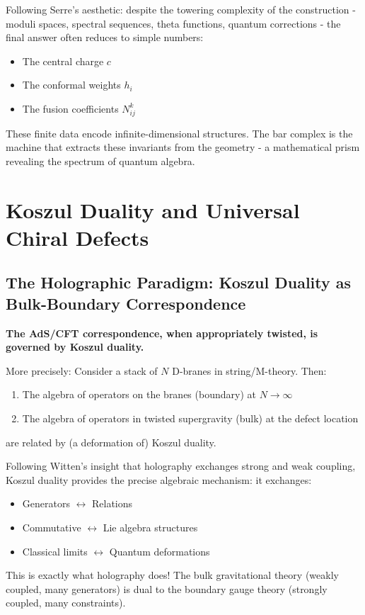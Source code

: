 \begin{remark}
Following Serre's aesthetic: despite the towering complexity of the construction - moduli spaces, spectral sequences, theta functions, quantum corrections - the final answer often reduces to simple numbers:
\begin{itemize}
\item The central charge $c$
\item The conformal weights $h_i$  
\item The fusion coefficients $N_{ij}^k$
\end{itemize}
These finite data encode infinite-dimensional structures. The bar complex is the machine that extracts these invariants from the geometry - a mathematical prism revealing the spectrum of quantum algebra.
\end{remark}

\section{Koszul Duality and Universal Chiral Defects}\label{sec:koszul-defects}

\subsection{The Holographic Paradigm: Koszul Duality as Bulk-Boundary Correspondence}

\begin{principle}\label{principle:costello-li}
\textbf{The AdS/CFT correspondence, when appropriately twisted, is governed by Koszul duality.}

More precisely: Consider a stack of $N$ D-branes in string/M-theory. Then:
\begin{enumerate}
\item The algebra of operators on the branes (boundary) at $N \to \infty$
\item The algebra of operators in twisted supergravity (bulk) at the defect location
\end{enumerate}
are related by (a deformation of) Koszul duality.
\end{principle}

\begin{remark}
Following Witten's insight that holography exchanges strong and weak coupling, Koszul duality provides the precise algebraic mechanism: it exchanges:
\begin{itemize}
\item Generators $\leftrightarrow$ Relations
\item Commutative $\leftrightarrow$ Lie algebra structures
\item Classical limits $\leftrightarrow$ Quantum deformations
\end{itemize}
This is exactly what holography does! The bulk gravitational theory (weakly coupled, many generators) is dual to the boundary gauge theory (strongly coupled, many constraints).
\end{remark}

